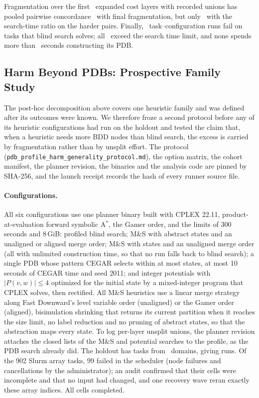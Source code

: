 \documentclass[letterpaper]{article}
\newcommand{\num}[1]{\numprint{#1}}
\newcommand{\astar}{A\ensuremath{^{*}}}
\theoremstyle{plain}
\theoremstyle{definition}
\theoremstyle{remark}
\begin{document}
Fragmentation over the first \HarmPrefixLayers\ expanded cost layers with
recorded unions has pooled pairwise concordance
\HarmPrefixFragConcordance\ with final fragmentation, but only
\HarmHardPrefixTimeConcordance\ with the search-time ratio on the harder
pairs.  Finally, \HarmLosses\ task--configuration runs fail on tasks that
blind search solves; all \HarmLossesTimeout\ exceed the search time limit,
and none spends more than \HarmLossesMaxConstruction\ seconds constructing
its PDB.

\FloatBarrier
\subsection{Harm Beyond PDBs: Prospective Family Study}
\label{sec:supp-harm-generality}

The post-hoc decomposition above covers one heuristic family and was defined
after its outcomes were known.  We therefore froze a second protocol before
any of its heuristic configurations had run on the holdout and tested the
claim that, when a heuristic needs more BDD nodes than blind search, the
excess is carried by fragmentation rather than by unsplit effort.  The
protocol (\texttt{pdb\_profile\_harm\_generality\_protocol.md}), the option
matrix, the cohort manifest, the planner revision, the binaries and the
analysis code are pinned by SHA-256, and the launch receipt records the hash
of every runner source file.

\paragraph{Configurations.}
All six configurations use one planner binary built with CPLEX 22.11,
product-at-evaluation forward symbolic \astar, the Gamer order, and the
limits of 300 seconds and 8\,GiB: profiled blind search; M\&S with
\num{10000} abstract states and an unaligned or aligned merge order; M\&S
with \num{50000} states and an unaligned merge order (all with unlimited
construction time, so that no run falls back to blind search); a single PDB
whose pattern CEGAR selects within at most \num{1000000} states, at most 10 seconds of CEGAR
time and seed 2011; and integer potentials with $|P(v,w)|\leq4$ optimized for
the initial state by a mixed-integer program that CPLEX solves, then
rectified.  All M\&S heuristics use a linear merge strategy along Fast
Downward's level variable order (unaligned) or the Gamer order (aligned),
bisimulation shrinking that returns its current partition when it reaches
the size limit, no label reduction and no pruning of abstract states, so
that the abstraction maps every state.  To log per-layer unsplit unions, the planner revision
attaches the closed lists of the M\&S and potential searches to the profile,
as the PDB search already did.  The holdout has \num{\GenTasks} tasks from \HoldoutDomains\
domains, giving \num{\GenCells} runs.  Of the 902 Slurm array tasks, 99
failed in the scheduler (node failures and cancellations by the
administrator); an audit confirmed that their cells were incomplete and that
no input had changed, and one recovery wave reran exactly these array
indices.  All \num{\GenCells} cells completed.
\end{document}
